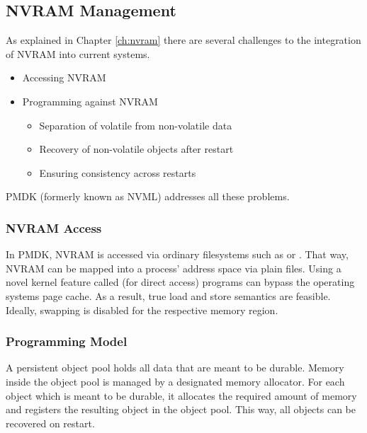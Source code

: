 
\subsection{NVRAM Management}
\label{ch:impl-pmdk}

As explained in Chapter \ref{ch:nvram} there are several challenges to the integration of NVRAM into current systems.

\begin{itemize}
    \item Accessing NVRAM
    \item Programming against NVRAM
    \begin{itemize}
        \item Separation of volatile from non-volatile data
        \item Recovery of non-volatile objects after restart
        \item Ensuring consistency across restarts
    \end{itemize}
\end{itemize}

PMDK (formerly known as NVML) addresses all these problems.

\subsubsection{NVRAM Access}

In PMDK, NVRAM is accessed via ordinary filesystems such as  or . That way, NVRAM can be mapped into a process' address space via plain files. Using a novel kernel feature called  (for direct access) programs can bypass the operating systems page cache. As a result, true load and store semantics are feasible. Ideally, swapping is disabled for the respective memory region.

\subsubsection{Programming Model}

A persistent object pool holds all data that are meant to be durable. Memory inside the object pool is managed by a designated memory allocator. For each object which is meant to be durable, it allocates the required amount of memory and registers the resulting object in the object pool. This way, all objects can be recovered on restart.

